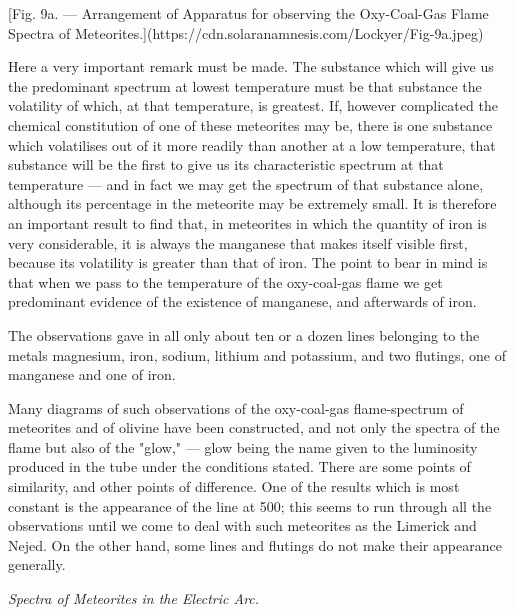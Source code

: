 \documentclass[a4paper, 12pt, oneside, polutonikogreek, english]{article}
\begin{document}
[Fig. 9a. --- Arrangement of Apparatus for observing the Oxy-Coal-Gas Flame Spectra of Meteorites.](https://cdn.solaranamnesis.com/Lockyer/Fig-9a.jpeg)

Here a very important remark must be made. The substance which will give us the predominant spectrum at lowest temperature must be that substance the volatility of which, at that temperature, is greatest. If, however complicated the chemical constitution of one of these meteorites may be, there is one substance which volatilises out of it more readily than another at a low temperature, that substance will be the first to give us its characteristic spectrum at that temperature --- and in fact we may get the spectrum of that substance alone, although its percentage in the meteorite may be extremely small. It is therefore an important result to find that, in meteorites in which the quantity of iron is very considerable, it is always the manganese that makes itself visible first, because its volatility is greater than that of iron. The point to bear in mind is that when we pass to the temperature of the oxy-coal-gas flame we get predominant evidence of the existence of manganese, and afterwards of iron.

The observations gave in all only about ten or a dozen lines belonging to the metals magnesium, iron, sodium, lithium and potassium, and two flutings, one of manganese and one of iron.

Many diagrams of such observations of the oxy-coal-gas flame-spectrum of meteorites and of olivine have been constructed, and not only the spectra of the flame but also of the "glow," --- glow being the name given to the luminosity produced in the tube under the conditions stated. There are some points of similarity, and other points of difference. One of the results which is most constant is the appearance of the line at 500; this seems to run through all the observations until we come to deal with such meteorites as the Limerick and Nejed. On the other hand, some lines and flutings do not make their appearance generally.

\emph{Spectra of Meteorites in the Electric Arc.}
\end{document}
